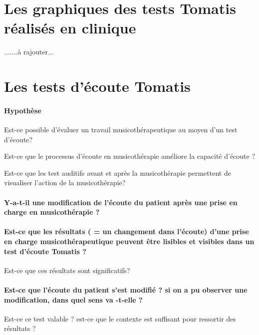 \begin{enumerate}
{     }
     
   
   
   
   
  \end{enumerate}


\section{Les graphiques des tests Tomatis réalisés en clinique }
.......à rajouter...



\section{Les tests d'écoute Tomatis}
\paragraph{Hypothèse}

Est-ce possible d'évaluer un travail musicothérapeutique au moyen
d'un test d'écoute?

Est-ce que le processus d'écoute en musicothérapie améliore la capacité
d'écoute ?

Est-ce que les test auditifs avant et après la musicothérapie permettent
de visualiser l'action de la musicothérapie?

\paragraph{Y-a-t-il une modification de l'écoute du patient après une prise
en charge en musicothérapie ?}

\paragraph{Est-ce que les résultats ( = un changement dans l'écoute) d'une prise
en charge musicothérapeutique peuvent être lisibles et visibles dans
un test d'écoute Tomatis ?}

Est-ce que ces résultats sont significatifs? 

\paragraph{Est-ce que l'écoute du patient s'est modifié ? si on a pu observer
une modification, dans quel sens va -t-elle ?}

Est-ce ce test valable ? est-ce que le contexte est suffisant pour
ressortir des résultats ?





